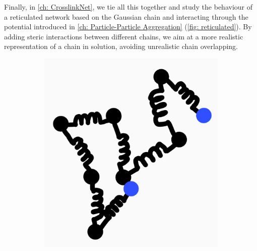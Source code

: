\documentclass[../../main.tex]{subfiles}
\begin{document}
    Finally, in \cref{ch: CrosslinkNet}, we tie all this together and study the behaviour of a reticulated network based on the Gaussian chain and interacting through the potential introduced in \cref{ch: Particle-Particle Aggregation} (\cref{fig: reticulated}). By adding steric interactions between different chains, we aim at a more realistic representation of a chain in solution, avoiding unrealistic chain overlapping. 
        \begin{figure}[h]
            \centering
            \begin{subfigure}[b]{0.328\textwidth}
                \centering
                \includegraphics[width=\textwidth]{Figures/intra.png}
                \caption{}
                \label{fig: intra}
            \end{subfigure}
            \hfill
            \begin{subfigure}[b]{0.328\textwidth}
                \centering

\end{subfigure}
\end{figure}
\end{document}
